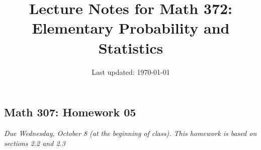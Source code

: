\documentclass[10pt]{article}
\title{Lecture Notes for Math 372: \\Elementary Probability and Statistics}
\date{Last updated: \today}
\theoremstyle{definition}
\newtheorem{problem}[theorem]{Problem}
\newcommand{\1}[1]{\textbf{1}_{\left[#1\right]}} %
\newcommand{\dempfcolor}[1]{{\color{RoyalBlue}#1}}
\newcommand{\demph}[1]{\dempfcolor{{\sl #1}}}
\begin{document}
\begin{center}
  \section*{Math 307: Homework 05}
  \textit{Due Wednesday, October 8 (at the beginning of class). This homework
    is based on sections 2.2 and 2.3}
\end{center}


\end{document}
